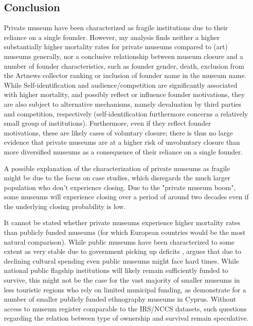 \documentclass[12pt]{article}
\begin{document}
\subsection*{Conclusion}

Private museum have been characterized as fragile institutions due to their reliance on a single founder.
However, my analysis finds neither a higher substantially higher mortality rates for private museums compared to (art) museums generally, nor a conclusive relationship between museum closure and a number of founder characteristics, such as founder gender, death, exclusion from the Artnews collector ranking or inclusion of founder name in the museum name.
While Self-identification and audience/competition are significantly associated with higher mortality, and possibly reflect or influence founder motivations, they are also subject to alternative mechanisms, namely devaluation by third parties and competition, respectively (self-identification furthermore concerns a relatively small group of institutions).
Furthermore, even if they reflect founder motivations, these are likely cases of voluntary closure; there is thus no large evidence that private museums are at a higher risk of unvoluntary closure than more diversified museums as a consequence of their reliance on a single founder. 



A possible explanation of the characterization of private museums as fragile might be due to the focus on case studies, which disregards the much larger population who don't experience closing.
Due to the "private museum boom", some museums will experience closing over a period of around two decades even if the underlying closing probability is low.





It cannot be stated whether private museums experience higher mortality rates than publicly funded museums (for which European countries would be the most natural comparison).
While public museums have been characterized to some extent as very stable due to government picking up deficits \parencite{Meier_Frey_2003_faces,Bechtler_Imhof_2018_future}, \textcite{Walker_2019_collector} argues that due to declining cultural spending even public museums might face hard times.
While national public flagship institutions will likely remain sufficiently funded to survive, this might not be the case for the vast majority of smaller museums in less touristic regions who rely on limited municipal funding, as \textcite{StylianouLambert_etal_2014_museums} demonstrate for a number of smaller publicly funded ethnography museums in Cyprus.
Without access to museum register comparable to the IRS/NCCS datasets, such questions regarding the relation between type of ownership and survival remain speculative.
\end{document}
